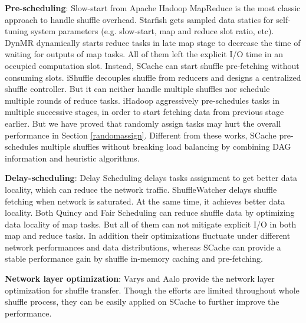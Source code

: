 \textbf{Pre-scheduling}: Slow-start from Apache Hadoop MapReduce \cite{hadoop} is the most classic approach to handle shuffle overhead. Starfish \cite{starfish} gets sampled data statics for self-tuning system parameters (e.g. slow-start, map and reduce slot ratio, etc). DynMR \cite{dynmr} dynamically starts reduce tasks in late map stage to decrease the time of waiting for outputs of map tasks. All of them left the explicit I/O time in an occupied computation slot. Instead, SCache can start shuffle pre-fetching without consuming slots. iShuffle \cite{ishuffle} decouples shuffle from reducers and designs a centralized shuffle controller. But it can neither handle multiple shuffles nor schedule multiple rounds of reduce tasks. iHadoop \cite{ihadoop} aggressively pre-schedules tasks in multiple successive stages, in order to start fetching data from previous stage earlier. But we have proved that randomly assign tasks may hurt the overall performance in Section \ref{randomassign}. Different from these works, SCache pre-schedules multiple shuffles without breaking load balancing by combining DAG information and heuristic algorithms.

\textbf{Delay-scheduling}: Delay Scheduling \cite{delay} delays tasks assignment to get better data locality, which can reduce the network traffic. ShuffleWatcher \cite{shufflewatcher} delays shuffle fetching when network is saturated. At the same time, it achieves better data locality. Both Quincy \cite{quincy} and Fair Scheduling \cite{preemptive} can reduce shuffle data by optimizing data locality of map tasks. But all of them can not mitigate explicit I/O in both map and reduce tasks. In addition their optimizations fluctuate under different network performances and data distributions, whereas SCache can provide a stable performance gain by shuffle in-memory caching and pre-fetching.

\textbf{Network layer optimization}: Varys \cite{varys} and Aalo \cite{aalo} provide the network layer optimization for shuffle transfer. Though the efforts are limited throughout whole shuffle process, they can be easily applied on SCache to further improve the performance.